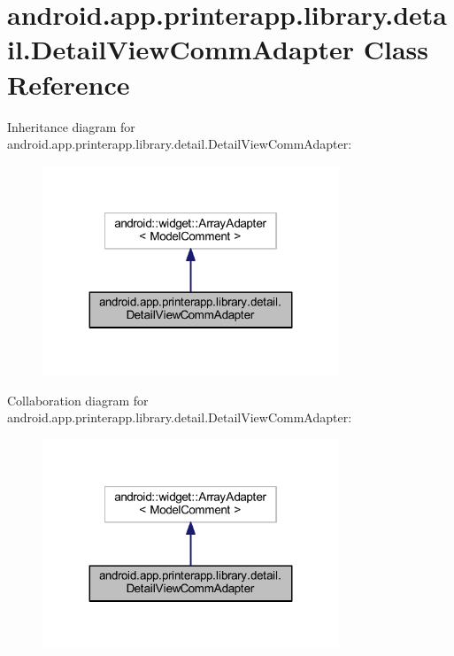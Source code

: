 \hypertarget{classandroid_1_1app_1_1printerapp_1_1library_1_1detail_1_1_detail_view_comm_adapter}{}\section{android.\+app.\+printerapp.\+library.\+detail.\+Detail\+View\+Comm\+Adapter Class Reference}
\label{classandroid_1_1app_1_1printerapp_1_1library_1_1detail_1_1_detail_view_comm_adapter}


Inheritance diagram for android.\+app.\+printerapp.\+library.\+detail.\+Detail\+View\+Comm\+Adapter\+:
\nopagebreak
\begin{figure}[H]
\begin{center}
\leavevmode
\includegraphics[width=251pt]{classandroid_1_1app_1_1printerapp_1_1library_1_1detail_1_1_detail_view_comm_adapter__inherit__graph}
\end{center}
\end{figure}


Collaboration diagram for android.\+app.\+printerapp.\+library.\+detail.\+Detail\+View\+Comm\+Adapter\+:
\nopagebreak
\begin{figure}[H]
\begin{center}
\leavevmode
\includegraphics[width=251pt]{classandroid_1_1app_1_1printerapp_1_1library_1_1detail_1_1_detail_view_comm_adapter__coll__graph}
\end{center}
\end{figure}
